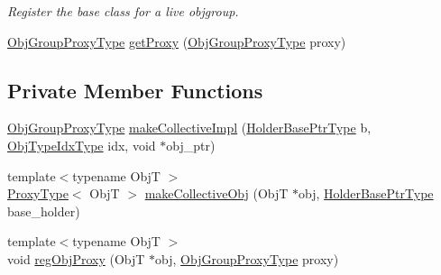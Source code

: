 \begin{DoxyCompactItemize}
\begin{DoxyCompactList}\small\item\em Register the base class for a live objgroup. \end{DoxyCompactList}\item 
\hyperlink{namespacevt_ad7cae989df485fccca57f0792a880a8e}{Obj\+Group\+Proxy\+Type} \hyperlink{structvt_1_1objgroup_1_1_obj_group_manager_a9569c5ad1c032a90573bd987c64f560a}{get\+Proxy} (\hyperlink{namespacevt_ad7cae989df485fccca57f0792a880a8e}{Obj\+Group\+Proxy\+Type} proxy)
\end{DoxyCompactItemize}
\subsection*{Private Member Functions}
\begin{DoxyCompactItemize}
\item 
\hyperlink{namespacevt_ad7cae989df485fccca57f0792a880a8e}{Obj\+Group\+Proxy\+Type} \hyperlink{structvt_1_1objgroup_1_1_obj_group_manager_ab9885f22f148479bb68f3a59a147cdec}{make\+Collective\+Impl} (\hyperlink{structvt_1_1objgroup_1_1_obj_group_manager_ac1e9bb19d4a5923dd6d595bad28f04c9}{Holder\+Base\+Ptr\+Type} b, \hyperlink{namespacevt_1_1objgroup_a378e4b966221779c74f3a2f921eb2421}{Obj\+Type\+Idx\+Type} idx, void $\ast$obj\+\_\+ptr)
\item 
{\footnotesize template$<$typename ObjT $>$ }\\\hyperlink{structvt_1_1objgroup_1_1_obj_group_manager_aea65eef52f240a52210132eef5ce591f}{Proxy\+Type}$<$ ObjT $>$ \hyperlink{structvt_1_1objgroup_1_1_obj_group_manager_af5a05ad71853f2805cad4e08c2cedabe}{make\+Collective\+Obj} (ObjT $\ast$obj, \hyperlink{structvt_1_1objgroup_1_1_obj_group_manager_ac1e9bb19d4a5923dd6d595bad28f04c9}{Holder\+Base\+Ptr\+Type} base\+\_\+holder)
\item 
{\footnotesize template$<$typename ObjT $>$ }\\void \hyperlink{structvt_1_1objgroup_1_1_obj_group_manager_a73d5d6f3f63c1243d7f0ea11f33a4661}{reg\+Obj\+Proxy} (ObjT $\ast$obj, \hyperlink{namespacevt_ad7cae989df485fccca57f0792a880a8e}{Obj\+Group\+Proxy\+Type} proxy)
\end{DoxyCompactItemize}
